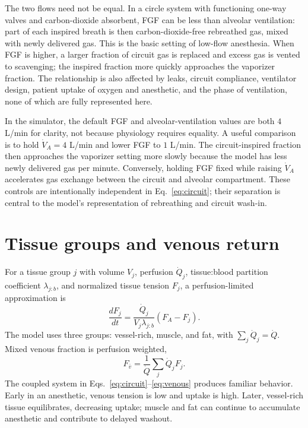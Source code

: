 \documentclass[11pt]{article}
\begin{document}
The two flows need not be equal.  In a circle system with functioning one-way valves and carbon-dioxide absorbent, FGF can be less than alveolar ventilation: part of each inspired breath is then carbon-dioxide-free rebreathed gas, mixed with newly delivered gas.  This is the basic setting of low-flow anesthesia.  When FGF is higher, a larger fraction of circuit gas is replaced and excess gas is vented to scavenging; the inspired fraction more quickly approaches the vaporizer fraction.  The relationship is also affected by leaks, circuit compliance, ventilator design, patient uptake of oxygen and anesthetic, and the phase of ventilation, none of which are fully represented here.

In the simulator, the default FGF and alveolar-ventilation values are both $4$ L/min for clarity, not because physiology requires equality.  A useful comparison is to hold $\dot V_A=4$ L/min and lower FGF to $1$ L/min.  The circuit-inspired fraction then approaches the vaporizer setting more slowly because the model has less newly delivered gas per minute.  Conversely, holding FGF fixed while raising $\dot V_A$ accelerates gas exchange between the circuit and alveolar compartment.  These controls are intentionally independent in Eq.~\ref{eq:circuit}; their separation is central to the model's representation of rebreathing and circuit wash-in.

\section{Tissue groups and venous return}
For a tissue group $j$ with volume $V_j$, perfusion $\dot Q_j$, tissue:blood partition coefficient $\lambda_{j:b}$, and normalized tissue tension $F_j$, a perfusion-limited approximation is
\begin{equation}
\frac{dF_j}{dt}=\frac{\dot Q_j}{V_j\lambda_{j:b}}(F_A-F_j).
\label{eq:tissue}
\end{equation}
The model uses three groups: vessel-rich, muscle, and fat, with $\sum_j\dot Q_j=\dot Q$. Mixed venous fraction is perfusion weighted,
\begin{equation}
F_{\bar v}=\frac{1}{\dot Q}\sum_j \dot Q_jF_j.
\label{eq:venous}
\end{equation}
The coupled system in Eqs.~\ref{eq:circuit}--\ref{eq:venous} produces familiar behavior. Early in an anesthetic, venous tension is low and uptake is high. Later, vessel-rich tissue equilibrates, decreasing uptake; muscle and fat can continue to accumulate anesthetic and contribute to delayed washout.
\end{document}
